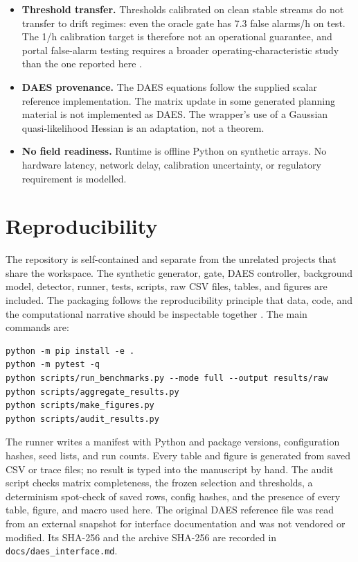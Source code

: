 \documentclass[11pt]{article}
\begin{document}
\begin{itemize}
  \item \textbf{Threshold transfer.} Thresholds calibrated on clean stable streams do not transfer to drift regimes: even the oracle gate has 7.3 false alarms/h on test. The 1/h calibration target is therefore not an operational guarantee, and portal false-alarm testing requires a broader operating-characteristic study than the one reported here \citep{burr2007alarm,leber2020false}.
  \item \textbf{DAES provenance.} The DAES equations follow the supplied scalar reference implementation. The matrix update in some generated planning material is not implemented as DAES. The wrapper's use of a Gaussian quasi-likelihood Hessian is an adaptation, not a theorem.
  \item \textbf{No field readiness.} Runtime is offline Python on synthetic arrays. No hardware latency, network delay, calibration uncertainty, or regulatory requirement is modelled.
\end{itemize}

\section{Reproducibility}

{\sloppy
The repository is self-contained and separate from the unrelated projects that share the workspace. The synthetic generator, gate, DAES controller, background model, detector, runner, tests, scripts, raw CSV files, tables, and figures are included. The packaging follows the reproducibility principle that data, code, and the computational narrative should be inspectable together \citep{peng2011reproducible}. The main commands are:\par}
\begin{verbatim}
python -m pip install -e .
python -m pytest -q
python scripts/run_benchmarks.py --mode full --output results/raw
python scripts/aggregate_results.py
python scripts/make_figures.py
python scripts/audit_results.py
\end{verbatim}
The runner writes a manifest with Python and package versions, configuration hashes, seed lists, and run counts. Every table and figure is generated from saved CSV or trace files; no result is typed into the manuscript by hand. The audit script checks matrix completeness, the frozen selection and thresholds, a determinism spot-check of saved rows, config hashes, and the presence of every table, figure, and macro used here. The original DAES reference file was read from an external snapshot for interface documentation and was not vendored or modified. Its SHA-256 and the archive SHA-256 are recorded in \texttt{docs/daes\_interface.md}.
\end{document}
